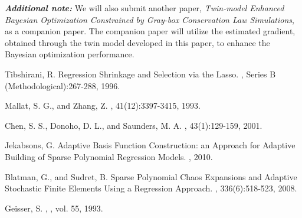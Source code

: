\documentclass[a4paper,twoside]{article}
\begin{document}
\emph{\textbf{Additional note:}}
We will also submit another paper, 
\emph{Twin-model Enhanced Bayesian Optimization Constrained by Gray-box Conservation Law Simulations},
as a companion paper.
The companion paper will utilize
the estimated gradient, obtained through the twin model developed in this paper, 
to enhance the Bayesian optimization performance. 



\begin{thebibliography}{9}

Tibshirani, R.
\newblock Regression Shrinkage and Selection via the Lasso.
, Series B (Methodological):267-288, 1996.

Mallat, S. G., and Zhang, Z.
, 41(12):3397-3415, 1993.

Chen, S. S., Donoho, D. L., and Saunders, M. A.
, 43(1):129-159, 2001.

Jekabsons, G.
\newblock Adaptive Basis Function Construction: an Approach for Adaptive Building of Sparse Polynomial Regression Models.
, 2010.

Blatman, G., and Sudret, B.
\newblock Sparse Polynomial Chaos Expansions and Adaptive Stochastic Finite Elements Using a Regression Approach.
, 336(6):518-523, 2008.

Geisser, S.
,
, vol. 55, 1993.

\end{thebibliography}
\end{document}

